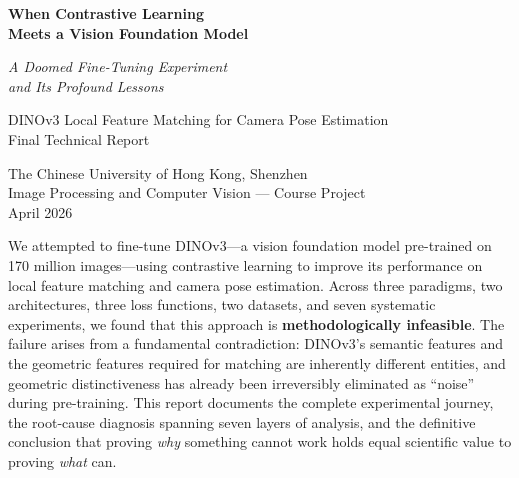 \documentclass[11pt,a4paper]{article}
\begin{document}
\begin{titlepage}
\centering
\vspace*{3.5cm}

{\fontsize{26}{32}\selectfont\bfseries When Contrastive Learning\\[6pt]
Meets a Vision Foundation Model\par}
\vspace{10pt}
{\LARGE\itshape A Doomed Fine-Tuning Experiment\\[3pt]
and Its Profound Lessons\par}

\vspace{28pt}
{\large DINOv3 Local Feature Matching for Camera Pose Estimation\\[4pt]
Final Technical Report\par}

\vspace{32pt}
{\large The Chinese University of Hong Kong, Shenzhen\\[3pt]
Image Processing and Computer Vision --- Course Project\\[4pt]
April 2026\par}

\vspace{28pt}
\begin{minipage}{0.88\textwidth}
\large
We attempted to fine-tune DINOv3---a vision foundation model pre-trained on 170 million images---using contrastive learning to improve its performance on local feature matching and camera pose estimation.
Across three paradigms, two architectures, three loss functions, two datasets, and seven systematic experiments, we found that this approach is \textbf{methodologically infeasible}.
The failure arises from a fundamental contradiction: DINOv3's semantic features and the geometric features required for matching are inherently different entities, and geometric distinctiveness has already been irreversibly eliminated as ``noise'' during pre-training.
This report documents the complete experimental journey, the root-cause diagnosis spanning seven layers of analysis, and the definitive conclusion that proving \emph{why} something cannot work holds equal scientific value to proving \emph{what} can.
\end{minipage}
\vfill
\end{titlepage}

\tableofcontents
\newpage
\end{document}
